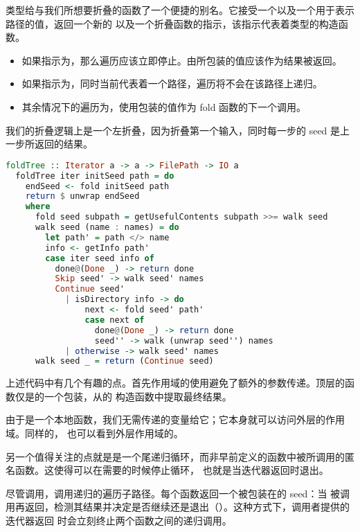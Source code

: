 \documentclass[./main.tex]{subfiles}
\begin{document}
类型给与我们所想要折叠的函数了一个便捷的别名。它接受一个以及一个用于表示路径的值，返回一个新的
以及一个折叠函数的指示，该指示代表着类型的构造函数。

\begin{itemize}
  \item 如果指示为，那么遍历应该立即停止。由所包装的值应该作为结果被返回。
  \item 如果指示为，同时当前代表着一个路径，遍历将不会在该路径上递归。
  \item 其余情况下的遍历为，使用包装的值作为 fold 函数的下一个调用。
\end{itemize}

我们的折叠逻辑上是一个左折叠，因为折叠第一个输入，同时每一步的 seed 是上一步所返回的结果。

\begin{lstlisting}[language=Haskell]
  foldTree :: Iterator a -> a -> FilePath -> IO a
  foldTree iter initSeed path = do
    endSeed <- fold initSeed path
    return $ unwrap endSeed
    where
      fold seed subpath = getUsefulContents subpath >>= walk seed
      walk seed (name : names) = do
        let path' = path </> name
        info <- getInfo path'
        case iter seed info of
          done@(Done _) -> return done
          Skip seed' -> walk seed' names
          Continue seed'
            | isDirectory info -> do
                next <- fold seed' path'
                case next of
                  done@(Done _) -> return done
                  seed'' -> walk (unwrap seed'') names
            | otherwise -> walk seed' names
      walk seed _ = return (Continue seed)
\end{lstlisting}

上述代码中有几个有趣的点。首先作用域的使用避免了额外的参数传递。顶层的函数仅是的一个包装，从的
构造函数中提取最终结果。

由于是一个本地函数，我们无需传递的变量给它；它本身就可以访问外层的作用域。同样的，
也可以看到外层作用域的。

另一个值得关注的点就是是一个尾递归循环，而非早前定义的函数中被所调用的匿名函数。这使得可以在需要的时候停止循环，
也就是当迭代器返回时退出。

尽管调用，调用递归的遍历子路径。每个函数返回一个被包装在的 seed：当
被调用再返回，检测其结果并决定是否继续还是退出（）。这种方式下，调用者提供的迭代器返回
时会立刻终止两个函数之间的递归调用。
\end{document}
